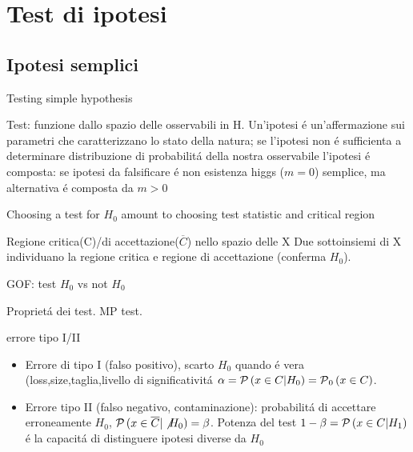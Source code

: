 \section{Test di ipotesi}

\subsection{Ipotesi semplici}

\begin{frame}{Testing simple hypothesis}

\begin{block}{Test: funzione dallo spazio delle osservabili in H.}
	Un'ipotesi \'e un'affermazione sui parametri che caratterizzano lo stato della natura; se l'ipotesi non \'e sufficienta a determinare distribuzione di probabilit\'a della nostra osservabile l'ipotesi \'e composta: se ipotesi da falsificare \'e non esistenza higgs ($m=0$) semplice, ma alternativa \'e composta da $m>0$
\end{block}
\begin{block}{Choosing a test for $H_0$ amount to choosing test statistic and critical region}
\end{block}
\begin{block}{Regione critica(C)/di accettazione($\overline{C}$) nello spazio delle X}
	Due sottoinsiemi di X individuano la regione critica e regione di accettazione (conferma $H_0$).
\end{block}
\begin{block}{GOF: test $H_0$ vs not $H_0$}
\end{block}
\end{frame}

\begin{frame}{Propriet\'a dei test. MP test.}
\begin{block}{errore tipo I/II}
\begin{itemize}
	\item Errore di tipo I (falso positivo), scarto $H_0$ quando \'e vera (loss,size,taglia,livello di significativit\'a $\alpha=\operatorname{\mathcal{P}}{(x\in C|H_0)}=\operatorname{\mathcal{P}}_0{(x\in C)}$.
	\item Errore tipo II (falso negativo, contaminazione): probabilit\'a di accettare erroneamente $H_0$, $\operatorname{\mathcal{P}}{(x\in\overline{C}|\not{H_0})}=\beta$. Potenza del test $1-\beta=\operatorname{\mathcal{P}}{(x\in C|H_1)}$ \'e la capacit\'a di distinguere ipotesi diverse da $H_0$ 
\end{itemize}
\end{block}
\end{frame}

